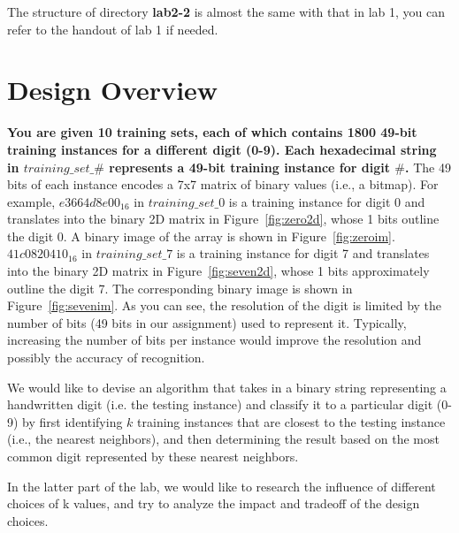 \documentclass[paper=letter, fontsize=10pt]{scrartcl} %
\numberwithin{equation}{section} %
\numberwithin{figure}{section} %
\numberwithin{table}{section} %
\begin{document}
The structure of directory \textbf{lab2-2} is almost the same with that in lab 1, you can refer to the handout of lab 1 if needed.

\section{Design Overview}

\textbf{You are given 10 training sets, each of which contains 1800 49-bit training instances for a different digit (0-9). Each hexadecimal string in $training\_set\_\#$ represents a 49-bit training instance for digit $\#$.} 
The 49 bits of each instance encodes a 7x7 matrix of binary values (i.e., a bitmap). For example, \texttt{$e3664d8e00_{16}$} in $training\_set\_0$ is a training instance for digit 0 and translates into the binary 2D matrix in Figure~\ref{fig:zero2d}, whose 1 bits outline the digit 0. A binary image of the array is shown in Figure~\ref{fig:zeroim}. \texttt{$41c0820410_{16}$} in $training\_set\_7$ is a training instance for digit 7 and translates into the binary 2D matrix in Figure~\ref{fig:seven2d}, whose 1 bits approximately outline the digit 7. The corresponding binary image is shown in Figure~\ref{fig:sevenim}. As you can see, the resolution of the digit is limited by the number of bits (49 bits in our assignment) used to represent it. Typically, increasing the number of bits per instance would improve the resolution and possibly the accuracy of recognition. 

We would like to devise an algorithm that takes in a binary string representing a handwritten digit (i.e. the testing instance) and classify it to a particular digit (0-9) by first identifying $k$ training instances that are closest to the testing instance (i.e., the nearest neighbors), and then determining the result based on the most common digit represented by these nearest neighbors. 

In the latter part of the lab, we would like to research the influence of different choices of k values, and try to analyze the impact and tradeoff of the design choices.
\end{document}

